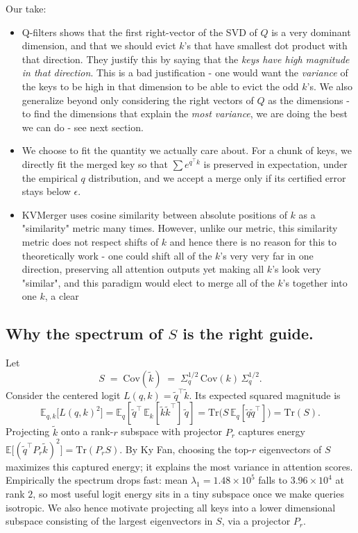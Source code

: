 \documentclass[11pt]{article}
\newcommand{\E}{\mathbb{E}}
\newcommand{\Cov}{\mathrm{Cov}}
\begin{document}
Our take:
\begin{itemize}
  \item Q-filters shows that the first right-vector of the SVD of $Q$ is a very dominant dimension, and that we should evict $k$'s that have smallest dot product with that direction. They justify this by saying that the \textit{keys have high magnitude in that direction}. This is a bad justification - one would want the \textit{variance} of the keys to be high in that dimension to be able to evict the odd $k$'s. We also generalize beyond only considering the right vectors of $Q$ as the dimensions - to find the dimensions that explain the \textit{most variance}, we are doing the best we can do - see next section.
  \item We choose to fit the quantity we actually care about. For a chunk of keys, we directly fit the merged key so that $\sum e^{q^\top k}$ is preserved in expectation, under the empirical $q$ distribution, and we accept a merge only if its certified error stays below $\epsilon$. 
  \item KVMerger uses cosine similarity between absolute positions of $k$ as a "similarity" metric many times. However, unlike our metric, this similarity metric does not respect shifts of $k$ and hence there is no reason for this to theoretically work - one could shift all of the $k$'s very very far in one direction, preserving all attention outputs yet making all $k$'s look very "similar", and this paradigm would elect to merge all of the $k$'s together into one $k$, a clear 
\end{itemize}

\subsection*{Why the spectrum of $S$ is the right guide.}

Let 
\[
S \;=\; \Cov(\tilde k)\;=\;\Sigma_q^{1/2}\,\Cov(k)\,\Sigma_q^{1/2}.
\]
Consider the centered logit $L(q,k)=\tilde q^\top \tilde k$. Its expected squared magnitude is
\[
\E_{q,k}\big[L(q,k)^2\big]
= \E_q\!\left[\tilde q^\top\,\E_k[\tilde k\tilde k^\top]\,\tilde q\right]
= \mathrm{Tr}\!\big(S\,\E_q[\tilde q \tilde q^\top]\big)
= \mathrm{Tr}(S).
\]
Projecting $\tilde k$ onto a rank-$r$ subspace with projector $P_r$ captures energy 
$\E\big[(\tilde q^\top P_r\tilde k)^2\big]=\mathrm{Tr}(P_r S)$. By Ky Fan, choosing the top-$r$ eigenvectors of $S$ maximizes this captured energy; it explains the most variance in attention scores. Empirically the spectrum drops fast: mean $\lambda_1=1.48\times 10^5$ falls to $3.96\times 10^4$ at rank $2$, so most useful logit energy sits in a tiny subspace once we make queries isotropic. We also hence motivate projecting all keys into a lower dimensional subspace consisting of the largest eigenvectors in $S$, via a projector $P_r$.
\end{document}
